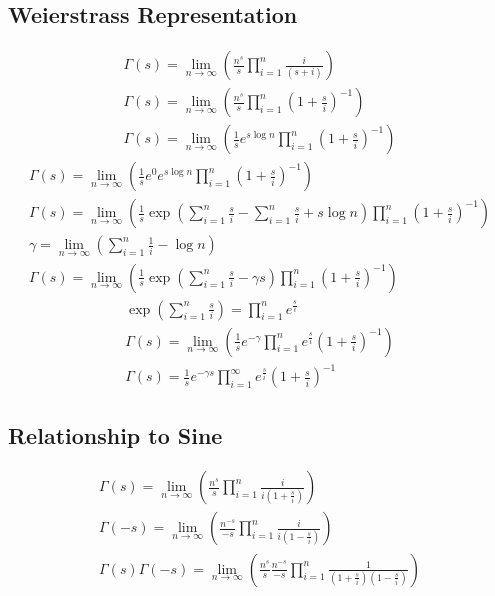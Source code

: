 	\subsection{Weierstrass Representation}
	$$
	\begin{gathered}
		\Gamma(s)=\lim _{n \rightarrow \infty}\left(\frac{n^s}{s} \prod_{i=1}^n \frac{i}{(s+i)}\right) \\
		\Gamma(s)=\lim _{n \rightarrow \infty}\left(\frac{n^s}{s} \prod_{i=1}^n\left(1+\frac{s}{i}\right)^{-1}\right) \\
		\Gamma(s)=\lim _{n \rightarrow \infty}\left(\frac{1}{s} e^{s \log n} \prod_{i=1}^n\left(1+\frac{s}{i}\right)^{-1}\right)
	\end{gathered}
	$$
	$$
	\begin{gathered}
		\Gamma(s)=\lim _{n \rightarrow \infty}\left(\frac{1}{s} e^0 e^{s \log n} \prod_{i=1}^n\left(1+\frac{s}{i}\right)^{-1}\right) \\
		\Gamma(s)=\lim _{n \rightarrow \infty}\left(\frac{1}{s} \exp{\left(\sum_{i=1}^n \frac{s}{i} - \sum_{i=1}^n \frac{s}{i} + s \operatorname{log} n\right) }  \prod_{i=1}^n\left(1+\frac{s}{i}\right)^{-1}\right) \\
		\gamma=\lim _{n \rightarrow \infty}\left(\sum_{i=1}^n \frac{1}{i}-\log n\right) \\
		\Gamma(s)=\lim _{n \rightarrow \infty}\left(\frac{1}{s} \exp{\left(\sum_{i=1}^n \frac{s}{i}-\gamma s\right)} \prod_{i=1}^n\left(1+\frac{s}{i}\right)^{-1}\right)
	\end{gathered}
	$$
	$$
	\begin{gathered}
		\exp{\left(\sum_{i=1}^n \frac{s}{i}\right)}=\prod_{i=1}^n e^{\frac{s}{i}} \\
		\Gamma(s)=\lim _{n \rightarrow \infty}\left(\frac{1}{s} e^{-\gamma} \prod_{i=1}^n e^{\frac{s}{i}}\left(1+\frac{s}{i}\right)^{-1}\right) \\
		\Gamma(s)=\frac{1}{s} e^{-\gamma s} \prod_{i=1}^{\infty} e^{\frac{s}{i}}\left(1+\frac{s}{i}\right)^{-1}
	\end{gathered}
	$$
	\subsection{Relationship to Sine}
	
	\begin{equation}
		\begin{gathered}
			\Gamma(s)=\lim_{n \rightarrow \infty}\left(\frac{n^s}{s} \prod_{i=1}^n \frac{i}{i\left(1+\frac{s}{i}\right)}\right) \\
			\Gamma(-s)=\lim_{n \rightarrow \infty}\left(\frac{n^{-s}}{-s} \prod_{i=1}^n \frac{i}{i\left(1-\frac{s}{i}\right)}\right) \\
			\Gamma(s) \Gamma(-s)=\lim_{n \rightarrow \infty}\left(\frac{n^s}{s} \frac{n^{-s}}{-s} \prod_{i=1}^n \frac{1}{\left(1+\frac{s}{i}\right)\left(1-\frac{s}{i}\right)}\right)
		\end{gathered}
	\end{equation}

